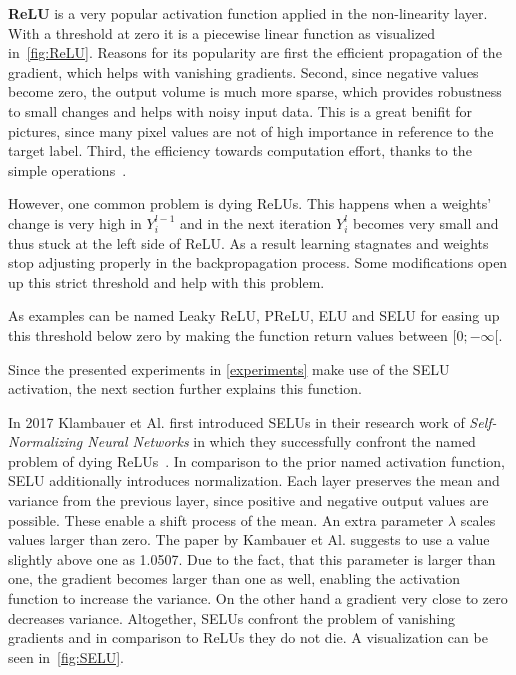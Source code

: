 \textbf{\gls{ReLU}} is a very popular activation function applied in the non-linearity layer.
With a threshold at zero it is a piecewise linear function as visualized in~\autoref{fig:ReLU}.
Reasons for its popularity are first the efficient propagation of the gradient, which helps with vanishing gradients.
Second, since negative values become zero, the output volume is much more sparse, which provides robustness to
small changes and helps with noisy input data.
This is a great benifit for pictures, since many pixel values are not of high importance in reference to
the target label.
Third, the efficiency towards computation effort, thanks to the simple operations~\cite{wikitumcnn, advanceddeeplearningpython}.

However, one common problem is dying \glspl{ReLU}.
This happens when a weights' change is very high in $Y_i^{l-1}$ and in the next iteration $Y_i^l$ becomes very small
and thus stuck at the left side of \gls{ReLU}.
As a result learning stagnates and weights
stop adjusting properly in the backpropagation process.
Some modifications open up this strict threshold and help with this problem.

As examples can be named Leaky ReLU, \gls{PReLU}, \gls{ELU} and \gls{SELU} for easing up this threshold
below zero by making the function return values between
$[0;-\infty[$.

Since the presented experiments in \autoref{experiments} make use of the \gls{SELU} activation,
the next section further explains this function.


In 2017 Klambauer et Al. first introduced \glspl{SELU} in their research work of
\textit{Self-Normalizing Neural Networks} in which they successfully confront the named problem of dying
\glspl{ReLU}~\cite{seluorigin}.
In comparison to the prior named activation function, \gls{SELU} additionally introduces normalization.
Each layer preserves the mean and variance from the previous layer, since positive and negative output values
are possible. These enable a shift process of the mean.
An extra parameter $\lambda$ scales values larger than zero.
The paper by Kambauer et Al. suggests to use a value slightly above one as 1.0507.
Due to the fact, that this parameter is larger than one, the gradient becomes larger than one as well, enabling
the activation function to increase the variance.
On the other hand a gradient very close to zero decreases variance.
Altogether, \glspl{SELU} confront the problem of vanishing gradients and in comparison to \glspl{ReLU} they do
not die. A visualization can be seen in~\autoref{fig:SELU}.

